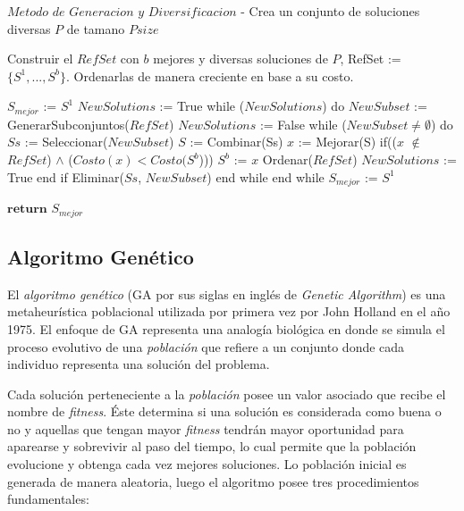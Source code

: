 \begin{code}[includerangemarker=false,frame=single,label=alg:SCA1,caption=Pseudocódigo de Búsqueda en Dispersión,firstnumber=100, mathescape]
$Metodo$ $de$ $Generacion$ $y$ $Diversificacion$ - Crea un conjunto de soluciones diversas $P$ de tamano $Psize$

Construir el $RefSet$ con $b$ mejores y diversas soluciones de $P$, RefSet := $\lbrace S^1,...,S^b \rbrace$. Ordenarlas de manera creciente en base a su costo.  

$S_{mejor}$ := $S^1$
$NewSolutions$ := True
while ($NewSolutions$) do
	$NewSubset$ := GenerarSubconjuntos($RefSet$)
	$NewSolutions$ := False
    while ($NewSubset\neq\emptyset $) do
    	$Ss$ := Seleccionar($NewSubset$)
    	$S$ := Combinar(Ss) 
    	$x$ := Mejorar(S)
		if(($x$ $\notin$ $RefSet$) $\wedge$ ($Costo(x)<Costo(S^b$)))
			$S^b$ := $x$
			Ordenar($RefSet$)
			$NewSolutions$ := True											
		end if
		Eliminar($Ss$, $NewSubset$)    	    				
	end while
end while
$S_{mejor}$ := $S^1$

$\textbf{return}$ $S_{mejor}$
\end{code}


\subsection{Algoritmo Genético} \label{subsect:GA}

El \emph{algoritmo genético} (GA por sus siglas en inglés de \emph{Genetic Algorithm}) es una metaheurística poblacional utilizada por primera vez por John Holland en el año 1975. El enfoque de GA representa una analogía biológica en donde se simula el proceso evolutivo de una \textit{población} que refiere a un conjunto donde cada individuo representa una solución del problema. 

Cada solución perteneciente a la \textit{población} posee un valor asociado que recibe el nombre de \textit{fitness}. Éste determina si una solución es considerada como buena o no y aquellas que tengan mayor \textit{fitness} tendrán mayor oportunidad para aparearse y sobrevivir al paso del tiempo, lo cual permite que la población evolucione y obtenga cada vez mejores soluciones. Lo población inicial es generada de manera aleatoria, luego el algoritmo posee tres procedimientos fundamentales:

